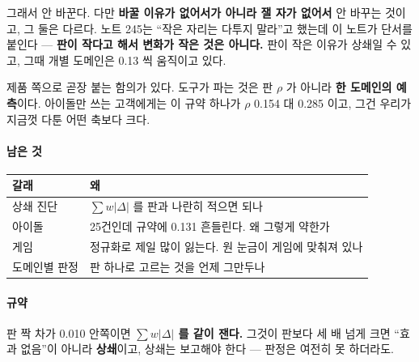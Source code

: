 \documentclass[10pt]{article}
\begin{document}
그래서 안 바꾼다. 다만 \textbf{바꿀 이유가 없어서가 아니라 잴 자가 없어서}
안 바꾸는 것이고, 그 둘은 다르다. 노트 245는 ``작은 자리는 다투지 말라''고
했는데 이 노트가 단서를 붙인다 --- \textbf{판이 작다고 해서 변화가 작은
것은 아니다.} 판이 작은 이유가 상쇄일 수 있고, 그때 개별 도메인은 0.13 씩
움직이고 있다.

제품 쪽으로 곧장 붙는 함의가 있다. 도구가 파는 것은 판 $\rho$ 가 아니라
\textbf{한 도메인의 예측}이다. 아이돌만 쓰는 고객에게는 이 규약 하나가
$\rho$ 0.154 대 0.285 이고, 그건 우리가 지금껏 다툰 어떤 축보다 크다.

\paragraph{남은 것}
\begin{center}\small
\begin{tabular}{ll}
\hline
갈래 & 왜 \\
\hline
상쇄 진단 & $\sum w|\Delta|$ 를 판과 나란히 적으면 되나 \\
아이돌 & 25건인데 규약에 0.131 흔들린다. 왜 그렇게 약한가 \\
게임 & 정규화로 제일 많이 잃는다. 원 눈금이 게임에 맞춰져 있나 \\
도메인별 판정 & 판 하나로 고르는 것을 언제 그만두나 \\
\hline
\end{tabular}
\end{center}

\paragraph{규약} 판 짝 차가 0.010 안쪽이면 \textbf{$\sum w|\Delta|$ 를 같이
잰다.} 그것이 판보다 세 배 넘게 크면 ``효과 없음''이 아니라 \textbf{상쇄}이고,
상쇄는 보고해야 한다 --- 판정은 여전히 못 하더라도.
\end{document}

